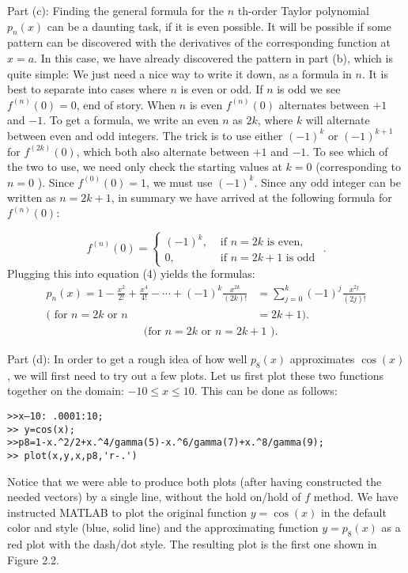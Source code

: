 \documentclass[../main.tex]{subfiles}
\begin{document}
Part (c): Finding the general formula for the $n$ th-order Taylor polynomial $p_{n}(x)$ can be a daunting task, if it is even possible. It will be possible if some pattern can be discovered with the derivatives of the corresponding function at $x=a$. In this case, we have already discovered the pattern in part (b), which is quite simple: We just need a nice way to write it down, as a formula in $n$. It is best to separate into cases where $n$ is even or odd. If $n$ is odd we see $f^{(n)}(0)=0$, end of story. When $n$ is even $f^{(n)}(0)$ alternates between $+1$ and $-1$. To get a formula, we write an even $n$ as $2 k$, where $k$ will alternate between even and odd integers. The trick is to use either $(-1)^{k}$ or $(-1)^{k+1}$ for $f^{(2 k)}(0)$, which both also alternate between $+1$ and $-1$. To see which of the two to use, we need only check the starting values at $k=0$ (corresponding to $n=0$ ). Since $f^{(0)}(0)=1$, we must use $(-1)^{k}$. Since any odd integer can be written as $n=2 k+1$, in summary we have arrived at the following formula for $f^{(n)}(0):$ 

$$
f^{(n)}(0)=\left\{\begin{array}{ll}
(-1)^{k}, & \text { if } n=2 k \text { is even, } \\
0, & \text { if } n=2 k+1 \text { is odd }
\end{array} .\right.
$$
Plugging this into equation (4) yields the formulas:
$$
\begin{aligned}
p_{n}(x)=1-\frac{x^{2}}{2 !}+\frac{x^{4}}{4 !}-\cdots+(-1)^{k} \frac{x^{2 k}}{(2 k) !} &=\sum_{j=0}^{k}(-1)^{j} \frac{x^{2 j}}{(2 j) !} \\
(\text { for } n=2 k \text { or } n&=2 k+1) .
\end{aligned}
$$
$$
\begin{aligned}
& \text { (for } n=2 k \text { or } n=2 k+1 \text { ). }
\end{aligned}
$$

Part (d): In order to get a rough idea of how well $p_{8}(x)$ approximates $\cos (x)$, we will first need to try out a few plots. Let us first plot these two functions together on the domain: $-10 \leq x \leq 10$. This can be done as follows:

\begin{verbatim}
>>x—10: .0001:10;
>> y=cos(x);
>>p8=1-x.^2/2+x.^4/gamma(5)-x.^6/gamma(7)+x.^8/gamma(9);
>> plot(x,y,x,p8,'r-.')
\end{verbatim}

Notice that we were able to produce both plots (after having constructed the needed vectors) by a single line, without the hold on/hold of $f$ method. We have instructed MATLAB to plot the original function $y=\cos (x)$ in the default color and style (blue, solid line) and the approximating function $y=p_{8}(x)$ as a red plot with the dash/dot style. The resulting plot is the first one shown in Figure 2.2.\\
\end{document}

